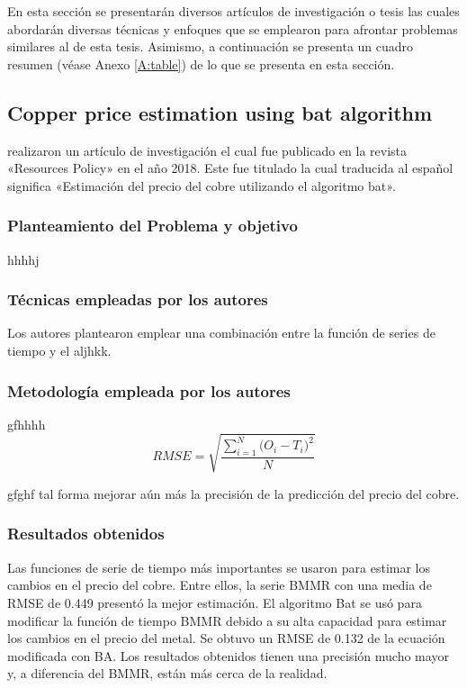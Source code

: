 En esta sección se presentarán diversos artículos de investigación o tesis las cuales abordarán diversas técnicas y enfoques que se emplearon para afrontar problemas similares al de esta tesis. Asimismo, a continuación se presenta un cuadro resumen (véase Anexo \ref{A:table}) de lo que se presenta en esta sección.


\subsection{Copper price estimation using bat algorithm \citep*{pr_dehghani2018copper}}
\citeauthor{pr_dehghani2018copper} realizaron un artículo de investigación el cual fue publicado en la revista «Resources Policy» en el año 2018. Este fue titulado  la cual traducida al español significa «Estimación del precio del cobre utilizando el algoritmo bat».

\subsubsection{Planteamiento del Problema y objetivo }
hhhhj

\subsubsection{Técnicas empleadas por los autores}
Los autores plantearon emplear una combinación entre la función de series de tiempo y el aljhkk. 

\subsubsection{Metodología empleada por los autores}
gfhhhh
\begin{equation}  
\label{eq:RMSE}
RMSE = \sqrt{\frac{\sum_{i=1}^{N}{\Big(O_i -T_i\Big)^2}}{N}}
\end{equation}

gfghf tal forma mejorar aún más la precisión de la predicción del precio del cobre.

\subsubsection{Resultados obtenidos}
Las funciones de serie de tiempo más importantes se usaron para estimar los cambios en el precio del cobre. Entre ellos, la serie BMMR con una media de RMSE de 0.449 presentó la mejor estimación. El algoritmo Bat  se usó para modificar la función de tiempo BMMR debido a su alta capacidad para estimar los cambios en el precio del metal. Se obtuvo un RMSE de 0.132 de la ecuación modificada con BA. Los resultados obtenidos tienen una precisión mucho mayor y, a diferencia del BMMR, están más cerca de la realidad.

 